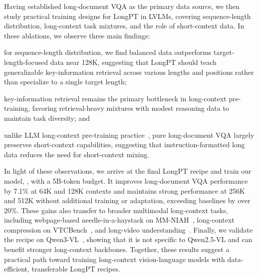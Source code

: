 Having established long-document VQA as the primary data source, we then study practical training designs for LongPT in LVLMs, covering sequence-length distribution, long-context task mixtures, and the role of short-context data. 
In these ablations, we observe three main findings: 
\begin{inparaenum}[i)]
\item for sequence-length distribution, we find balanced data outperforms target-length-focused data near 128K, suggesting that LongPT should teach generalizable key-information retrieval across various lengths and positions rather than specialize to a single target length;
\item key-information retrieval remains the primary bottleneck in long-context pre-training, favoring retrieval-heavy mixtures with modest reasoning data to maintain task diversity; and
\item unlike LLM long-context pre-training practice~\citep{gao2025prolong}, pure long-document VQA largely preserves short-context capabilities, suggesting that instruction-formatted long data reduces the need for short-context mixing.
\end{inparaenum}

In light of these observations, we arrive at the final LongPT recipe and train our model, \modelname, with a 5B-token budget.
It improves long-document VQA performance by 7.1\% at 64K and 128K contexts and maintains strong performance at 256K and 512K without additional training or adaptation, exceeding baselines by over 20\%. 
These gains also transfer to broader multimodal long-context tasks, including webpage-based needle-in-a-haystack on MM-NIAH~\citep{wang2024needle}, long-context compression on VTCBench~\citep{zhao2025vtcbench}, and long-video understanding~\citep{fu2025video,zhou2025mlvu,wu2024longvideobench}.
Finally, we validate the recipe on Qwen3-VL~\citep{bai2025qwen3}, showing that it is not specific to Qwen2.5-VL and can benefit stronger long-context backbones.
Together, these results suggest a practical path toward training long-context vision-language models with data-efficient, transferable LongPT recipes.